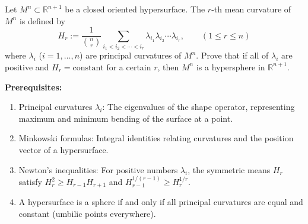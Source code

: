 \begin{exercise}
\label{geometry:2016:3}
Let $M^{n} \subset \mathbb{R}^{n+1}$ be a closed oriented hypersurface. The $r$-th mean curvature of $M^{n}$ is defined by
\[ H_{r} := \frac{1}{\binom{n}{r}} \sum_{i_{1} < i_{2} < \cdots < i_{r}} \lambda_{i_{1}}\lambda_{i_{2}}\cdots\lambda_{i_{r}}, \qquad (1 \leq r \leq n) \]
where $\lambda_{i}$ ($i = 1, \ldots, n$) are principal curvatures of $M^{n}$. Prove that if all of $\lambda_{i}$ are positive and $H_{r} = \text{constant}$ for a certain $r$, then $M^{n}$ is a hypersphere in $\mathbb{R}^{n+1}$.
\end{exercise}

\begin{solution}
\textbf{Prerequisites:}
\begin{enumerate}
    \item Principal curvatures $\lambda_i$: The eigenvalues of the shape operator, representing maximum and minimum bending of the surface at a point.
    \item Minkowski formulas: Integral identities relating curvatures and the position vector of a hypersurface.
    \item Newton's inequalities: For positive numbers $\lambda_i$, the symmetric means $H_r$ satisfy $H_r^2 \ge H_{r-1}H_{r+1}$ and $H_{r-1}^{1/(r-1)} \ge H_r^{1/r}$.
    \item A hypersurface is a sphere if and only if all principal curvatures are equal and constant (umbilic points everywhere).
\end{enumerate}


\end{solution}
